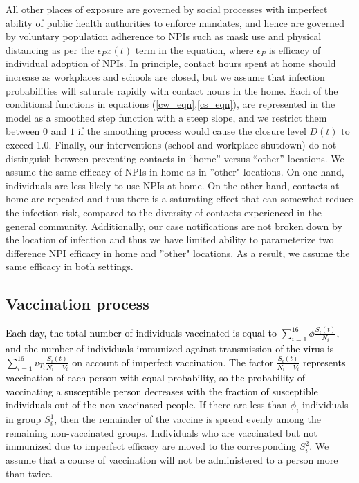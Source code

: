 All other places of exposure are governed by social processes with imperfect ability of public health authorities to enforce mandates, and hence are governed by voluntary population adherence to NPIs such as mask use and physical distancing as per the $\epsilon_P x(t)$ term in the equation, where $\epsilon_P$ is efficacy of individual adoption of NPIs.  In principle, contact hours spent at home should increase as workplaces and schools are closed, but we assume that infection probabilities will saturate rapidly with contact hours in the home. Each of the conditional functions in equations (\ref{cw_eqn},\ref{cs_eqn}), are represented in the model as a smoothed step function with a steep slope, and we restrict them between $0$ and $1$ if the smoothing process would cause the closure level $D(t)$ to exceed 1.0.   Finally, our interventions (school and workplace shutdown) do not distinguish between preventing contacts in “home” versus “other” locations. We assume the same efficacy of NPIs in home as in ''other" locations.  On one hand, individuals are less likely to use NPIs at home.  On the other hand, contacts at home are repeated and thus there is a saturating effect that can somewhat reduce the infection risk, compared to the diversity of contacts experienced in the general community.  Additionally, our case notifications are not broken down by the location of infection and thus we have limited ability to parameterize two difference NPI efficacy in home and ''other" locations.  As a result, we assume the same efficacy in both settings.

\subsection{Vaccination process}
\label{vaccination}
 \textcolor{black}{Each day, the total number of individuals vaccinated is equal to $\sum_{i = 1}^{16} \phi \frac{S_i(t)}{N_i}$, and the number of individuals immunized against transmission of the virus is $\sum_{i = 1}^{16} v_{T_i} \frac{S_i(t)}{N_i - V_i}$ on account of imperfect vaccination. The factor $\frac{S_i(t)}{N_i - V_i}$ represents vaccination of each person with equal probability, so the probability of vaccinating a susceptible person decreases with the fraction of susceptible individuals out of the non-vaccinated people.} If there are less than $\phi_i$ individuals in group $S^1_i$, then the remainder of the vaccine is spread evenly among the remaining non-vaccinated groups. Individuals who are vaccinated but not immunized due to imperfect efficacy are moved to the corresponding $S^2_i$. We assume that a course of vaccination will not be administered to a person more than twice.


